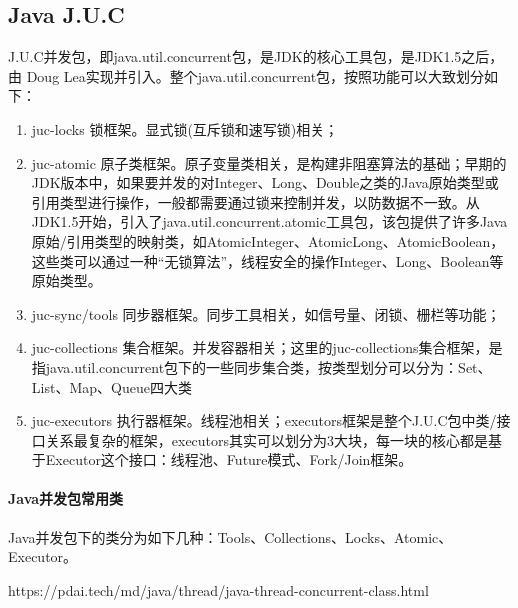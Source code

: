 \documentclass[../../../interview-questions.tex]{subfiles}
\begin{document}
\subsection{Java J.U.C}

J.U.C并发包，即java.util.concurrent包，是JDK的核心工具包，是JDK1.5之后，由 Doug Lea实现并引入。整个java.util.concurrent包，按照功能可以大致划分如下：

\begin{enumerate}
\item {juc-locks 锁框架。}显式锁(互斥锁和速写锁)相关；
\item {juc-atomic 原子类框架。}原子变量类相关，是构建非阻塞算法的基础；早期的JDK版本中，如果要并发的对Integer、Long、Double之类的Java原始类型或引用类型进行操作，一般都需要通过锁来控制并发，以防数据不一致。从JDK1.5开始，引入了java.util.concurrent.atomic工具包，该包提供了许多Java原始/引用类型的映射类，如AtomicInteger、AtomicLong、AtomicBoolean，这些类可以通过一种“无锁算法”，线程安全的操作Integer、Long、Boolean等原始类型。
\item {juc-sync/tools 同步器框架。}同步工具相关，如信号量、闭锁、栅栏等功能；
\item {juc-collections 集合框架。}并发容器相关；这里的juc-collections集合框架，是指java.util.concurrent包下的一些同步集合类，按类型划分可以分为：Set、List、Map、Queue四大类
\item{juc-executors 执行器框架。}线程池相关；executors框架是整个J.U.C包中类/接口关系最复杂的框架，executors其实可以划分为3大块，每一块的核心都是基于Executor这个接口：线程池、Future模式、Fork/Join框架。
\end{enumerate}

\paragraph{Java并发包常用类}

Java并发包下的类分为如下几种：Tools、Collections、Locks、Atomic、Executor。

https://pdai.tech/md/java/thread/java-thread-concurrent-class.html
\end{document}
